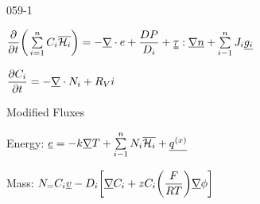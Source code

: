 \begin{mitframe}{059-1}
\begin{listone}
	\item $\dfrac{\partial}{\partial {t}}\bigg(\sum\limits_{\state=1}^{n}\conc_{\state}\overline{\henry}\bigg)=-\gradop\cdot\e+\dfrac{\elecdisplace\p}{\pdiff}+\uuline{\torque}:\gradop\uline{n}+\sum\limits_{\state-1}^{n}\molspecflux\uline{\grav_{\state}}$
    \item $\dfrac{\partial\conc_{\state}}{\partial{t}}=-\gradop\cdot\massspecflux{i}+\specsource{i}$
    		\begin{listtwo}
            	\item Modified Fluxes
                	\begin{listthree}
                    		\item Energy: $\mcef=-\thermcond\gradop\Temp+\sum\limits_{\state-1}^{n}
                            \massspecflux{i}\overline{\henry}+\uline{\dufour}$
                               \item Mass: $\massspecflux=\conc_{\state}\uline{\vvel}-\pdiff\bigg[\gradop\conc_{\state}+z\conc_{\state}\bigg(\dfrac{\force}{\gasconst\Temp}\bigg)\gradop\eleccoeff\bigg]$
                               
                            
                    \end{listthree}
            \end{listtwo}
\end{listone}
\end{mitframe}